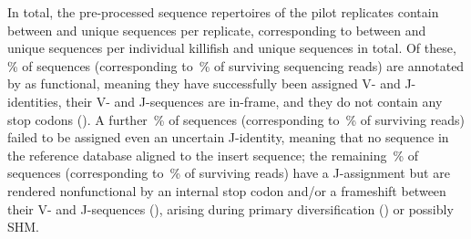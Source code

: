 In total, the pre-processed sequence repertoires of the pilot replicates contain between  and  unique sequences per replicate, corresponding to between  and  unique sequences per individual killifish and  unique sequences in total. Of these, \,\% of sequences (corresponding to \,\% of surviving sequencing reads) are annotated by  as functional, meaning they have successfully been assigned V- and J-identities, their V- and J-sequences are in-frame, and they do not contain any stop codons (). A further \,\% of sequences (corresponding to \,\% of surviving reads) failed to be assigned even an uncertain J-identity, meaning that no \jh sequence in the reference database aligned to the insert sequence; the remaining \,\% of sequences (corresponding to \,\% of surviving reads) have a J-assignment but are rendered nonfunctional by an internal stop codon and/or a frameshift between their V- and J-sequences (), arising during primary diversification () or possibly SHM.

